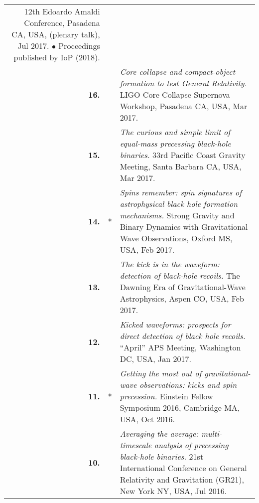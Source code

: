 {\begin{longtable}{rp{0.3cm}p{15.8cm}}
\newline{}
12th Edoardo Amaldi Conference, Pasadena CA, USA, (plenary talk), Jul 2017.
\newline{}
\textcolor{color1}{$\bullet$} Proceedings published by IoP (2018).
\vspace{0.05cm}\\
%
\textbf{16.} &  & \textit{Core collapse and compact-object formation to test General Relativity.}
\newline{}
LIGO Core Collapse Supernova Workshop, Pasadena CA, USA, Mar 2017.
\vspace{0.05cm}\\
%
\textbf{15.} &  & \textit{The curious and simple limit of equal-mass precessing black-hole binaries.}
\newline{}
33rd Pacific Coast Gravity Meeting, Santa Barbara CA, USA, Mar 2017.
\vspace{0.05cm}\\
%
\textbf{14.} & * & \textit{Spins remember: spin signatures of astrophysical black hole formation mechanisms.}
\newline{}
Strong Gravity and Binary Dynamics with Gravitational Wave Observations, Oxford MS, USA, Feb 2017.
\vspace{0.05cm}\\
%
\textbf{13.} &  & \textit{The kick is in the waveform: detection of black-hole recoils.}
\newline{}
The Dawning Era of Gravitational-Wave Astrophysics, Aspen CO, USA, Feb 2017.
\vspace{0.05cm}\\
%
\textbf{12.} &  & \textit{Kicked waveforms: prospects for direct detection of black hole recoils.}
\newline{}
``April'' APS Meeting, Washington DC, USA, Jan 2017.
\vspace{0.05cm}\\
%
\textbf{11.} & * & \textit{Getting the most out of gravitational-wave observations: kicks and spin precession.}
\newline{}
Einstein Fellow Symposium 2016, Cambridge MA, USA, Oct 2016.
\vspace{0.05cm}\\
%
\textbf{10.} &  & \textit{Averaging the average: multi-timescale analysis of precessing black-hole binaries.}
\newline{}
21st International Conference on General Relativity and Gravitation (GR21), New York NY, USA, Jul 2016.
\vspace{0.05cm}\\

\end{longtable}}
